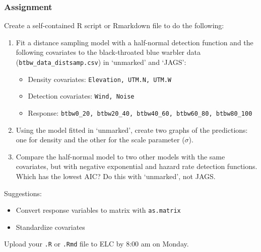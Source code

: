 \documentclass[color=usenames,dvipsnames]{beamer}\usepackage[]{graphicx}\usepackage[]{xcolor}
\newcommand{\inr}[1]{\colorbox{inlinecolor}{\texttt{#1}}}
\begin{document}
\begin{frame}[fragile]
  \frametitle{Assignment}
  \footnotesize
  Create a self-contained R script or Rmarkdown file to do the following:
  \vfill
  \begin{enumerate}
    \footnotesize
    \item Fit a distance sampling model with a half-normal detection
      function and the following covariates to the black-throated blue
      warbler data ({\tt btbw\_data\_distsamp.csv}) in `unmarked' and
      `JAGS':   
      \begin{itemize}
        \footnotesize
        \item Density covariates: {\tt Elevation, UTM.N, UTM.W}
        \item Detection covariates: {\tt Wind, Noise}
        \item Response: {\scriptsize \tt btbw0\_20, btbw20\_40, btbw40\_60, btbw60\_80, btbw80\_100}
      \end{itemize}
    \item Using the model fitted in `unmarked', create two graphs of
      the predictions: one for density and the other for the scale
      parameter ($\sigma$).
    \item Compare the half-normal model to two other models with the
      same covariates, but with negative exponential and hazard
      rate detection functions. Which has the lowest AIC? Do this with
      `unmarked', not JAGS.  
  \end{enumerate}
  \vfill
  Suggestions:
  \begin{itemize}
    \item Convert response variables to matrix with \inr{as.matrix}
    \item Standardize covariates
  \end{itemize}
  \vfill
  Upload your {\tt .R} or {\tt .Rmd} file to ELC by 8:00 am on Monday. 
\end{frame}
\end{document}
